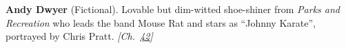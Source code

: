 \textbf{Andy Dwyer} (Fictional). Lovable but dim-witted shoe-shiner from \emph{Parks and Recreation} who leads the band Mouse Rat and stars as ``Johnny Karate'', portrayed by Chris Pratt. \emph{[Ch.~\hyperref[ch:iceslipperiness]{42}]}

